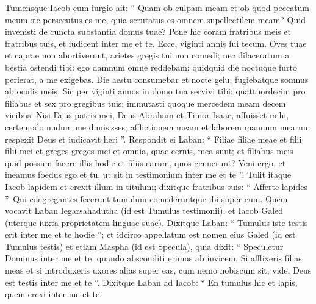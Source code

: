 \begin{biblechapter}
\begin{biblechapter}
\begin{biblechapter}
\begin{biblechapter}
\begin{biblechapter}
\begin{biblechapter}
\begin{biblechapter}
\begin{biblechapter}
\begin{biblechapter}
\begin{biblechapter}
\begin{biblechapter}
\begin{biblechapter}
\begin{biblechapter}
\begin{biblechapter}
\begin{biblechapter}
\begin{biblechapter}
\begin{biblechapter}
\begin{biblechapter}
\begin{biblechapter}
\begin{biblechapter}
\begin{biblechapter}
\begin{biblechapter}
\begin{biblechapter}
\begin{biblechapter}
\begin{biblechapter}
\begin{biblechapter}
\begin{biblechapter}
\begin{biblechapter}
\begin{biblechapter}
\begin{biblechapter}
\begin{biblechapter}
 \verse Tumensque Iacob cum iurgio ait: “ Quam ob culpam meam et ob quod peccatum meum sic persecutus es me, 
\verse quia scrutatus es omnem supellectilem meam? Quid invenisti de cuncta substantia domus tuae? Pone hic coram fratribus meis et fratribus tuis, et iudicent inter me et te. 
\verse Ecce, viginti annis fui tecum. Oves tuae et caprae non abortiverunt, arietes gregis tui non comedi; 
 \verse nec dilaceratum a bestia ostendi tibi: ego damnum omne reddebam; quidquid die noctuque furto perierat, a me exigebas. 
\verse Die aestu consumebar et nocte gelu, fugiebatque somnus ab oculis meis. 
\verse Sic per viginti annos in domo tua servivi tibi: quattuordecim pro filiabus et sex pro gregibus tuis; immutasti quoque mercedem meam decem vicibus. 
\verse Nisi Deus patris mei, Deus Abraham et Timor Isaac, affuisset mihi, certemodo nudum me dimisisses; afflictionem meam et laborem manuum mearum respexit Deus et iudicavit heri ”.
 \verse Respondit ei Laban: “ Filiae filiae meae et filii filii mei et greges greges mei et omnia, quae cernis, mea sunt; et filiabus meis quid possum facere illis hodie et filiis earum, quos genuerunt? 
\verse Veni ergo, et ineamus foedus ego et tu, ut sit in testimonium inter me et te ”.
 \verse Tulit itaque Iacob lapidem et erexit illum in titulum; 
\verse dixitque fratribus suis: “ Afferte lapides ”. Qui congregantes fecerunt tumulum comederuntque ibi super eum. 
\verse Quem vocavit Laban Iegarsahadutha (id est Tumulus testimonii), et Iacob Galed (uterque iuxta proprietatem linguae suae). 
 \verse Dixitque Laban: “ Tumulus iste testis erit inter me et te hodie ”; et idcirco appellatum est nomen eius Galed (id est Tumulus testis) 
\verse et etiam Maspha (id est Specula), quia dixit: “ Speculetur Dominus inter me et te, quando absconditi erimus ab invicem. 
\verse Si afflixeris filias meas et si introduxeris uxores alias super eas, cum nemo nobiscum sit, vide, Deus est testis inter me et te ”. 
\verse Dixitque Laban ad Iacob: “ En tumulus hic et lapis, quem erexi inter me et te. 

\end{biblechapter}
\end{biblechapter}
\end{biblechapter}
\end{biblechapter}
\end{biblechapter}
\end{biblechapter}
\end{biblechapter}
\end{biblechapter}
\end{biblechapter}
\end{biblechapter}
\end{biblechapter}
\end{biblechapter}
\end{biblechapter}
\end{biblechapter}
\end{biblechapter}
\end{biblechapter}
\end{biblechapter}
\end{biblechapter}
\end{biblechapter}
\end{biblechapter}
\end{biblechapter}
\end{biblechapter}
\end{biblechapter}
\end{biblechapter}
\end{biblechapter}
\end{biblechapter}
\end{biblechapter}
\end{biblechapter}
\end{biblechapter}
\end{biblechapter}
\end{biblechapter}
